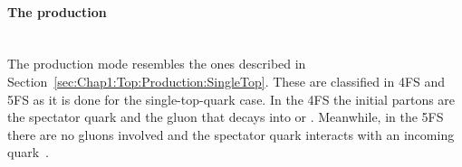 %				
% 		 
%
% 		  		  		 


\paragraph{The \tHq production}\mbox{}\\

The \tchannel \tH production mode resembles the ones described in Section~\ref{sec:Chap1:Top:Production:SingleTop}.
These are classified in 4FS and 5FS as it is done for the single-top-quark case. In the 4FS the initial partons 
are the spectator quark and the gluon that decays into \bbbar or \ttbar. Meanwhile, in the 5FS there are no gluons involved
and the spectator quark interacts with an incoming \Pbottom quark~\cite{Maltoni:2012pa}.

